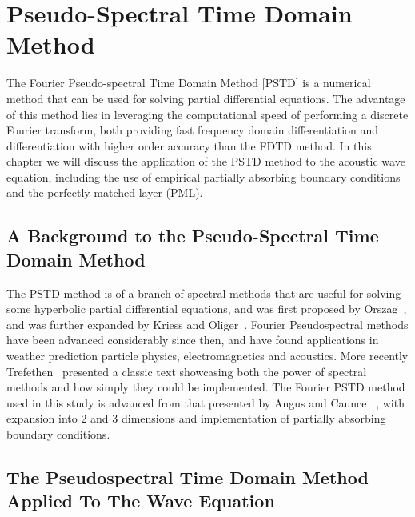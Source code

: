 %
%
%
\chapter{Pseudo-Spectral Time Domain Method}
The Fourier Pseudo-spectral Time Domain Method [PSTD] is a numerical method that can be used for solving partial differential equations. The advantage of this method lies in leveraging the computational speed of performing a discrete Fourier transform, both providing fast frequency domain differentiation and differentiation with higher order accuracy than the FDTD method. In this chapter we will discuss the application of the PSTD method to the acoustic wave equation, including the use of empirical partially absorbing boundary conditions and the perfectly matched layer (PML).

\section{A Background to the Pseudo-Spectral Time Domain Method}
\label{sec:1}
The PSTD method is of a branch of spectral methods that are useful for solving some hyperbolic partial differential equations, and was first proposed by Orszag~\cite{Orszag1971}, and was further expanded by Kriess and Oliger~\cite{Kreiss1972}. Fourier Pseudospectral methods have been advanced considerably since then, and have found applications in weather prediction particle physics, electromagnetics and acoustics. More recently Trefethen~\cite{Trefethen2000} presented a classic text showcasing both the power of spectral methods and how simply they could be implemented. The Fourier PSTD method used in this study is advanced from that presented by Angus and Caunce ~\cite{Angus2010}, with expansion into 2 and 3 dimensions and implementation of partially absorbing boundary conditions.                                               

\section{The Pseudospectral Time Domain Method Applied To The Wave Equation}
\label{sec:2}

